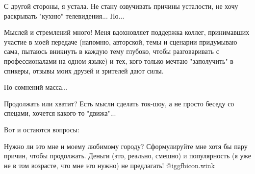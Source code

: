 С другой стороны, я устала. Не стану озвучивать причины усталости, не хочу
раскрывать "кухню" телевидения... Но...

Мыслей и стремлений много! Меня вдохновляет поддержка коллег, принимавших
участие в моей передаче (напомню, авторской, темы и сценарии придумываю сама,
пытаюсь вникнуть в каждую тему глубоко, чтобы разговаривать с профессионалами
на одном языке)  и тех, кого только мечтаю "заполучить" в спикеры, отзывы моих
друзей и зрителей дают силы. 

Но сомнений масса...

Продолжать или хватит? Есть мысли сделать ток-шоу, а не просто беседу со
спецами, хочется какого-то "движа"...

Вот и остаются вопросы: 

Нужно ли это мне и моему любимому городу? Сформулируйте мне хотя бы пару
причин, чтобы продолжать. Деньги (это, реально, смешно) и популярность (я уже
не в том возрасте, что мне это нужно) не предлагать!  @igg{fbicon.wink} 

